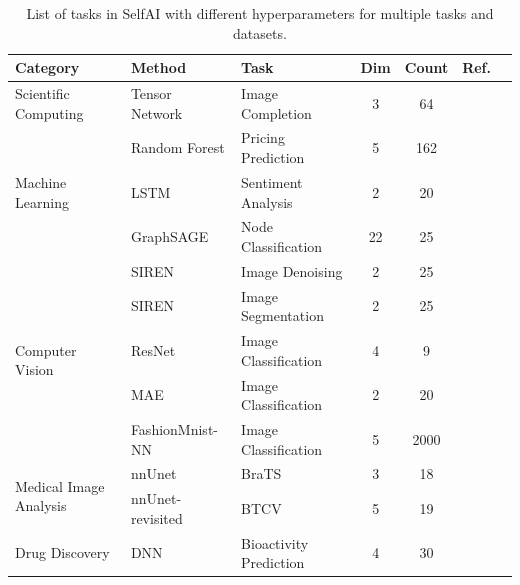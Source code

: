 \begin{table}[h!]
\centering
\setlength{\tabcolsep}{4pt}
\renewcommand{\arraystretch}{1.2}
\caption{List of tasks in SelfAI with different hyperparameters for multiple tasks and datasets.}
\begin{tabular}{@{}lllcccc@{}}
\toprule
\textbf{Category} & \textbf{Method} & \textbf{Task} & \textbf{Dim} & \textbf{Count} & \textbf{Ref.} \\ 
\midrule
\multirow{1}{*}{Scientific Computing} & Tensor Network & Image Completion & 3 & 64 & \cite{tw} \\  
\hline
\multirow{3}{*}{Machine Learning} 
 & Random Forest & Pricing Prediction & 5 & 162 & \cite{boston} \\
 & LSTM & Sentiment Analysis & 2 & 20 & \cite{sentiment_analysis} \\ 
 & GraphSAGE & Node Classification & 22 & 25 & \cite{yan2023unreal} \\ 
 \hline
\multirow{5}{*}{Computer Vision} & SIREN & Image Denoising & 2 & 25 & \cite{sitzmann2020implicit} \\
 & SIREN & Image Segmentation & 2 & 25 & \cite{sitzmann2020implicit} \\
 & ResNet & Image Classification & 4 & 9 & \cite{resnet} \\ 
 & MAE & Image Classification & 2 & 20 & \cite{mae} \\ 
 & FashionMnist-NN & Image Classification & 5 & 2000 & \cite{zimmer2021auto} \\ 
\hline
\multirow{2}{*}{Medical Image Analysis} & nnUnet & BraTS~\cite{brats} & 3 & 18 & \cite{nnunet} \\
 & nnUnet-revisited & BTCV~\cite{btcv} & 5 & 19 & \cite{nnunet_revisit} \\
Drug Discovery & DNN & Bioactivity Prediction & 4 & 30 & \cite{korotcov2017comparison} \\
\bottomrule
\end{tabular}
\label{tab:task_list}
\end{table}


